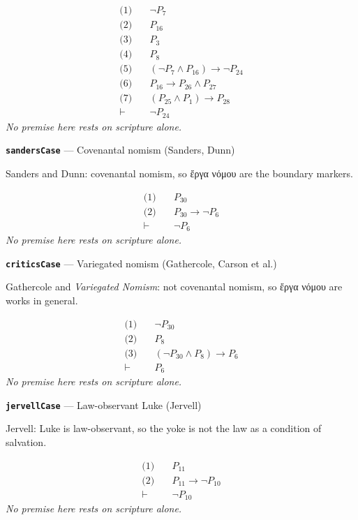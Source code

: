 \documentclass[11pt]{article}
\begin{document}
\begin{align*}
  \text{(1)} \quad & \lnot P_{7} \\
  \text{(2)} \quad & P_{16} \\
  \text{(3)} \quad & P_{3} \\
  \text{(4)} \quad & P_{8} \\
  \text{(5)} \quad & (\lnot P_{7} \land P_{16}) \rightarrow \lnot P_{24} \\
  \text{(6)} \quad & P_{16} \rightarrow P_{26} \land P_{27} \\
  \text{(7)} \quad & (P_{25} \land P_{1}) \rightarrow P_{28} \\
  \vdash \quad & \lnot P_{24}
\end{align*}
\emph{No premise here rests on scripture alone.}
\par\medskip\noindent\textbf{\texttt{sanders\allowbreak{}Case}} --- Covenantal nomism (Sanders, Dunn)\par\nobreak\noindent
Sanders and Dunn: covenantal nomism, so ἔργα νόμου are the boundary markers.

\begin{align*}
  \text{(1)} \quad & P_{30} \\
  \text{(2)} \quad & P_{30} \rightarrow \lnot P_{6} \\
  \vdash \quad & \lnot P_{6}
\end{align*}
\emph{No premise here rests on scripture alone.}
\par\medskip\noindent\textbf{\texttt{critics\allowbreak{}Case}} --- Variegated nomism (Gathercole, Carson et al.)\par\nobreak\noindent
Gathercole and \emph{Variegated Nomism}: not covenantal nomism, so ἔργα νόμου are works in general.

\begin{align*}
  \text{(1)} \quad & \lnot P_{30} \\
  \text{(2)} \quad & P_{8} \\
  \text{(3)} \quad & (\lnot P_{30} \land P_{8}) \rightarrow P_{6} \\
  \vdash \quad & P_{6}
\end{align*}
\emph{No premise here rests on scripture alone.}
\par\medskip\noindent\textbf{\texttt{jervell\allowbreak{}Case}} --- Law-observant Luke (Jervell)\par\nobreak\noindent
Jervell: Luke is law-observant, so the yoke is not the law as a condition of salvation.

\begin{align*}
  \text{(1)} \quad & P_{11} \\
  \text{(2)} \quad & P_{11} \rightarrow \lnot P_{10} \\
  \vdash \quad & \lnot P_{10}
\end{align*}
\emph{No premise here rests on scripture alone.}
\end{document}
